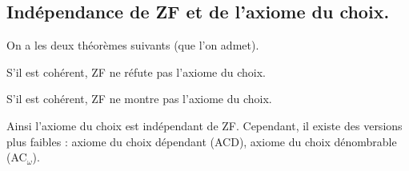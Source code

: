 \documentclass[./main]{subfiles}
\begin{document}
  \subsection{Indépendance de ZF et de l'axiome du choix.}

  On a les deux théorèmes suivants (que l'on admet).

  \begin{thm}[Gödel, 1938]
    S'il est cohérent, ZF ne réfute pas l'axiome du choix.
  \end{thm}

  \begin{thm}[Cohen, 1963]
    S'il est cohérent, ZF ne montre pas l'axiome du choix.
  \end{thm}

  Ainsi l'axiome du choix est indépendant de ZF.
  Cependant, il existe des versions plus faibles : axiome du choix dépendant (\textsf{ACD}), axiome du choix dénombrable (\textsf{AC}${}_\omega$).
\end{document}
